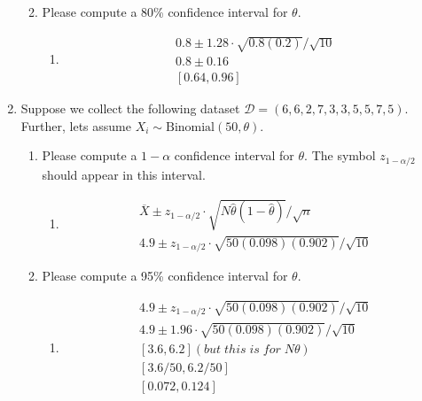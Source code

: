 \documentclass[krantz1,ChapterTOCs]{krantz}
\begin{document}
\begin{enumerate}
\begin{enumerate}
\begin{enumerate}
{            } 
        \end{enumerate}

            \item Please compute a 80\% confidence interval for $\theta$.
        \begin{enumerate}
            \item {
            \color{red} 
                \begin{align}
                    0.8 \pm 1.28 \cdot \sqrt{0.8 (0.2)} / \sqrt{10} \\ 
                    0.8 \pm 0.16 \\
                    [0.64, 0.96]
                \end{align}
        
            } 
        \end{enumerate}

        \end{enumerate}
        
    \item Suppose we collect the following dataset $\mathcal{D} = (6, 6, 2, 7, 3, 3, 5, 5, 7, 5)$. Further, lets assume $X_{i} \sim \text{Binomial}(50,\theta)$.
        \begin{enumerate}
            \item Please compute a $1-\alpha$ confidence interval for $\theta$. The symbol $z_{1-\alpha/2}$ should appear in this interval. 
            \begin{enumerate}
            \item {
            \color{red} 
                \begin{align}
                  \overline{X} \pm z_{1-\alpha/2} \cdot  \sqrt{ N\hat{\theta}(1-\hat{\theta})} /\sqrt{n}\\
                  4.9 \pm z_{1-\alpha/2} \cdot  \sqrt{50 (0.098)(0.902)} /\sqrt{10}
                \end{align}
        
            } 
        \end{enumerate}

            \item Please compute a 95\% confidence interval for $\theta$.
            \begin{enumerate}
            \item {
            \color{red} 
            
            \begin{align}
                 4.9 \pm z_{1-\alpha/2} \cdot  \sqrt{50 (0.098)(0.902)} /\sqrt{10}\\
                 4.9 \pm 1.96 \cdot  \sqrt{50 (0.098)(0.902)} /\sqrt{10}\\
                 [3.6, 6.2 ] (but\; this\; is\; for\; N\theta)\\
                 [3.6/50 , 6.2/50 ]\\
                 [0.072, 0.124]\\
            \end{align}
        
}
\end{enumerate}
\end{enumerate}
\end{enumerate}
\end{document}

